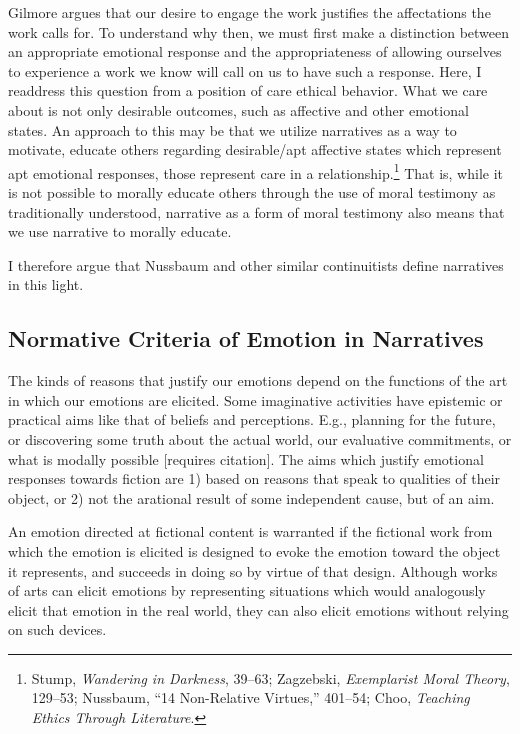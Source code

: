 \documentclass[phdthesis,12pt,final]{wuthesis}
\theoremstyle{definition}
\theoremstyle{definition}
\theoremstyle{definition}
\theoremstyle{definition}
\theoremstyle{remark}
\begin{document}
Gilmore argues that our desire to engage the work justifies the affectations the work calls for. To understand why then, we must first make a distinction between an appropriate emotional response and the appropriateness of allowing ourselves to experience a work we know will call on us to have such a response. Here, I readdress this question from a position of care ethical behavior. What we care about is not only desirable outcomes, such as affective and other emotional states. An approach to this may be that we utilize narratives as a way to motivate, educate others regarding desirable/apt affective states which represent apt emotional responses, those represent care in a relationship.\footnote{Stump, \emph{Wandering in {Darkness}}, 39--63; Zagzebski, \emph{Exemplarist {Moral Theory}}, 129--53; Nussbaum, {``14 {Non-Relative Virtues},''} 401--54; Choo, \emph{Teaching Ethics Through Literature}.} That is, while it is not possible to morally educate others through the use of moral testimony as traditionally understood, narrative as a form of moral testimony also means that we use narrative to morally educate.

I therefore argue that Nussbaum and other similar continuitists define narratives in this light.

\subsection*{Normative Criteria of Emotion in Narratives}\label{normative-criteria-of-emotion-in-narratives}

The kinds of reasons that justify our emotions depend on the functions of the art in which our emotions are elicited. Some imaginative activities have epistemic or practical aims like that of beliefs and perceptions. E.g., planning for the future, or discovering some truth about the actual world, our evaluative commitments, or what is modally possible {[}requires citation{]}. The aims which justify emotional responses towards fiction are 1) based on reasons that speak to qualities of their object, or 2) not the arational result of some independent cause, but of an aim.

An emotion directed at fictional content is warranted if the fictional work from which the emotion is elicited is designed to evoke the emotion toward the object it represents, and succeeds in doing so by virtue of that design. Although works of arts can elicit emotions by representing situations which would analogously elicit that emotion in the real world, they can also elicit emotions without relying on such devices.
\end{document}
